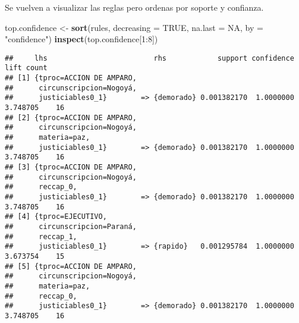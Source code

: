 \documentclass[runningheads,a4paper]{llncs}
\newenvironment{Shaded}{\footnotesize}{}
\newcommand{\KeywordTok}[1]{\textcolor[rgb]{0.00,0.44,0.13}{\textbf{{#1}}}}
\newcommand{\DataTypeTok}[1]{\textcolor[rgb]{0.56,0.13,0.00}{{#1}}}
\newcommand{\DecValTok}[1]{\textcolor[rgb]{0.25,0.63,0.44}{{#1}}}
\newcommand{\StringTok}[1]{\textcolor[rgb]{0.25,0.44,0.63}{{#1}}}
\newcommand{\OtherTok}[1]{\textcolor[rgb]{0.00,0.44,0.13}{{#1}}}
\newcommand{\NormalTok}[1]{{#1}}
\newcommand{\OperatorTok}[1]{\textcolor[rgb]{0.40,0.40,0.40}{{#1}}}
\begin{document}
\normalsize

Se vuelven a visualizar las reglas pero ordenas por soporte y confianza.

\scriptsize

\begin{Shaded}
\begin{Highlighting}[]
\NormalTok{top.confidence <-}\StringTok{ }\KeywordTok{sort}\NormalTok{(rules, }\DataTypeTok{decreasing =} \OtherTok{TRUE}\NormalTok{, }
                       \DataTypeTok{na.last =} \OtherTok{NA}\NormalTok{, }\DataTypeTok{by =} \StringTok{"confidence"}\NormalTok{)}
\KeywordTok{inspect}\NormalTok{(top.confidence[}\DecValTok{1}\OperatorTok{:}\DecValTok{8}\NormalTok{])}
\end{Highlighting}
\end{Shaded}

\begin{verbatim}
##     lhs                         rhs            support confidence     lift count
## [1] {tproc=ACCION DE AMPARO,                                                    
##      circunscripcion=Nogoyá,                                                    
##      justiciables0_1}        => {demorado} 0.001382170  1.0000000 3.748705    16
## [2] {tproc=ACCION DE AMPARO,                                                    
##      circunscripcion=Nogoyá,                                                    
##      materia=paz,                                                               
##      justiciables0_1}        => {demorado} 0.001382170  1.0000000 3.748705    16
## [3] {tproc=ACCION DE AMPARO,                                                    
##      circunscripcion=Nogoyá,                                                    
##      reccap_0,                                                                  
##      justiciables0_1}        => {demorado} 0.001382170  1.0000000 3.748705    16
## [4] {tproc=EJECUTIVO,                                                           
##      circunscripcion=Paraná,                                                    
##      reccap_1,                                                                  
##      justiciables0_1}        => {rapido}   0.001295784  1.0000000 3.673754    15
## [5] {tproc=ACCION DE AMPARO,                                                    
##      circunscripcion=Nogoyá,                                                    
##      materia=paz,                                                               
##      reccap_0,                                                                  
##      justiciables0_1}        => {demorado} 0.001382170  1.0000000 3.748705    16

\end{verbatim}
\end{document}

